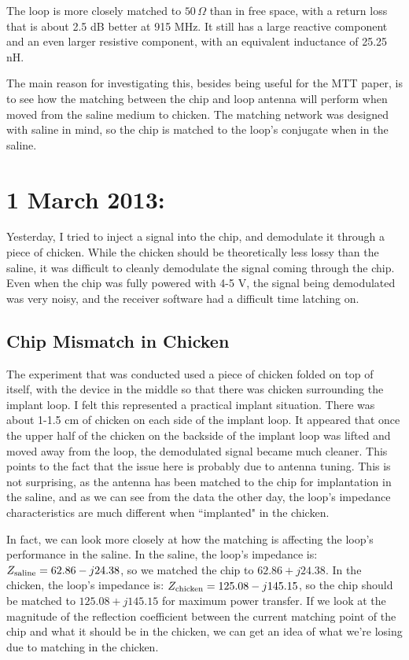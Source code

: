 \documentclass[12pt,onecolumn,titlepage]{article}
\begin{document}
The loop is more closely matched to $50 \, \Omega$ than in free space, with a return loss that is about 2.5 dB better at 915 MHz. It still has a large reactive component and an even larger resistive component, with an equivalent inductance of 25.25 nH.

The main reason for investigating this, besides being useful for the MTT paper, is to see how the matching between the chip and loop antenna will perform when moved from the saline medium to chicken. The matching network was designed with saline in mind, so the chip is matched to the loop's conjugate when in the saline. 


\clearpage
\section{1 March 2013:}

\indent \indent Yesterday, I tried to inject a signal into the chip, and demodulate it through a piece of chicken. While the chicken should be theoretically less lossy than the saline, it was difficult to cleanly demodulate the signal coming through the chip. Even when the chip was fully powered with 4-5 V, the signal being demodulated was very noisy, and the receiver software had a difficult time latching on.

\subsection{Chip Mismatch in Chicken}
The experiment that was conducted used a piece of chicken folded on top of itself, with the device in the middle so that there was chicken surrounding the implant loop. I felt this represented a practical implant situation. There was about 1-1.5 cm of chicken on each side of the implant loop. It appeared that once the upper half of the chicken on the backside of the implant loop was lifted and moved away from the loop, the demodulated signal became much cleaner. This points to the fact that the issue here is probably due to antenna tuning. This is not surprising, as the antenna has been matched to the chip for implantation in the saline, and as we can see from the data the other day, the loop's impedance characteristics are much different when ``implanted" in the chicken.

In fact, we can look more closely at how the matching is affecting the loop's performance in the saline. In the saline, the loop's impedance is: $Z_{{\rm{saline}}} = 62.86 - j24.38$, so we matched the chip to $62.86 + j24.38$. In the chicken, the loop's impedance is: $Z_{{\rm{chicken}}} = 125.08 - j145.15$, so the chip should be matched to $125.08 + j145.15$ for maximum power transfer. If we look at the magnitude of the reflection coefficient between the current matching point of the chip and what it should be in the chicken, we can get an idea of what we're losing due to matching in the chicken. 
\end{document}
